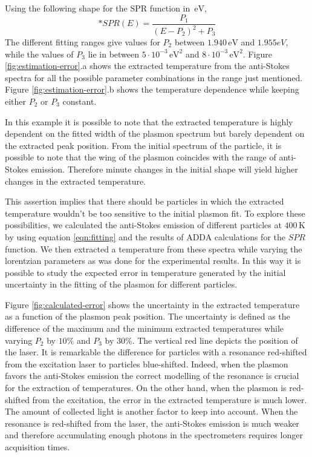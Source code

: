 \documentclass[journal=nalefd,manuscript=letter]{achemso}
\newcommand{\K}{\ensuremath{\,\textrm{K}}}
\newcommand{\eV}{\ensuremath{\,\textrm{eV}}}
\begin{document}
Using the following shape for the SPR function in $\eV$, \begin{equation}*
SPR(E) = \frac{P_1}{(E-P_2)^2+P_3}
\end{equation}
The different fitting ranges give values for $P_2$ between $1.940\eV$ and
$1.955eV$, while the values of $P_3$ lie in between $5\cdot10^{-3}\eV^2$ and
$8\cdot10^{-3}\eV^2$. Figure \ref{fig:estimation-error}.a shows the extracted
temperature from the anti-Stokes spectra for all the possible parameter
combinations in the range just mentioned. Figure \ref{fig:estimation-error}.b
shows the temperature dependence while keeping either $P_2$ or $P_3$ constant.

In this example it is possible to note that the extracted temperature is highly
dependent on the fitted width of the plasmon spectrum but barely dependent on
the extracted peak position. From the initial spectrum of the particle, it is
possible to note that the wing of the plasmon coincides with the range of
anti-Stokes emission. Therefore minute changes in the initial shape will yield
higher changes in the extracted temperature.

This assertion implies that there should be particles in which the extracted
temperature wouldn't be too sensitive to the initial plasmon fit. To explore
these possibilities, we calculated the anti-Stokes emission of different
particles at $400\K$ by using equation \ref{eqn:fitting} and the results of ADDA
calculations for the $SPR$ function. We then extracted a temperature from these
spectra while varying the lorentzian parameters as was done for the experimental
results. In this way it is possible to study the expected error in temperature
generated by the initial uncertainty in the fitting of the plasmon for different
particles. 

Figure \ref{fig:calculated-error} shows the uncertainty in the extracted
temperature as a function of the plasmon peak position. The uncertainty is
defined as the difference of the maximum and the minimum extracted temperatures
while varying $P_2$ by $10\%$ and $P_3$ by $30\%$. The vertical red line depicts
the position of the laser. It is remarkable the difference for particles with a
resonance red-shifted from the excitation laser to particles blue-shifted.
Indeed, when the plasmon favors the anti-Stokes emission the correct modelling
of the resonance is crucial for the extraction of temperatures. On the other
hand, when the plasmon is red-shifted from the excitation, the error in the
extracted temperature is much lower. The amount of collected light is
another factor to keep into account. When the resonance is red-shifted
from the laser, the anti-Stokes emission is much weaker and therefore
accumulating enough photons in the spectrometers requires longer acquisition
times.
\end{document}
